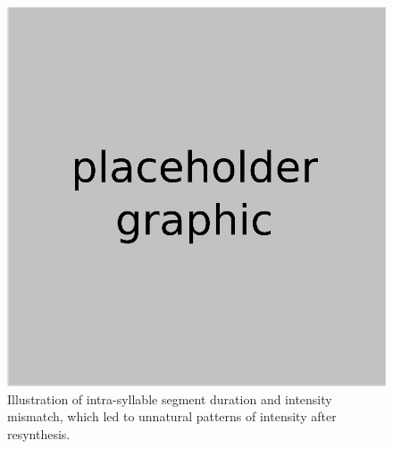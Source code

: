 \begin{figure}
	\begin{centering}
	\includegraphics{figures/xxx.eps}
	\caption[Segment duration mismatch in resynthesis]{Illustration of intra-syllable segment duration and intensity mismatch, which led to unnatural patterns of intensity after resynthesis.\label{fig:SegDurMismatch}}
	\end{centering}
\end{figure}

